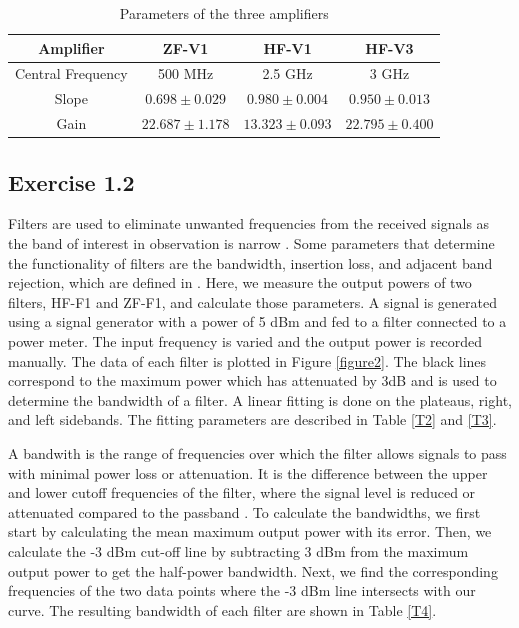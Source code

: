 \documentclass[12pt]{article}
\begin{document}
\begin{table}[H]
    \centering
    \caption{Parameters of the three amplifiers}
    \label{T1}
    \begin{tabular}{c |c |c |c}
        \hline
        \hline
        Amplifier & ZF-V1 & HF-V1 & HF-V3\\
        \hline
         Central Frequency & 500 MHz & 2.5 GHz & 3 GHz \\

        Slope & $0.698 \pm 0.029$ & $0.980 \pm 0.004$ & $0.950 \pm 0.013$ \\
     
        Gain & $22.687 \pm 1.178$ & $13.323 \pm 0.093$ & $22.795 \pm 0.400$ \\
        \hline
    \end{tabular}
\end{table}
\subsection{Exercise 1.2}
Filters are used to eliminate unwanted frequencies from the received signals as the band of interest in observation is narrow \cite{klein}. Some parameters that determine the functionality of filters are the bandwidth, insertion loss, and adjacent band rejection, which are defined in \cite{lecturenote}. Here, we measure the output powers of two filters, HF-F1 and ZF-F1, and calculate those parameters.  A signal is generated using a signal generator with a power of 5 dBm and fed to a filter connected to a power meter. The input frequency is varied and the output power is recorded manually. 
The data of each filter is plotted in Figure \ref{figure2}. The black lines correspond to the maximum power which has attenuated by 3dB and is used to determine the bandwidth of a filter. A linear fitting is done on the plateaus, right, and left sidebands. The fitting parameters are described in Table \ref{T2} and \ref{T3}. 

A bandwith is the range of frequencies over which the filter allows signals to pass with minimal power loss or attenuation. It is the difference between the upper and lower cutoff frequencies of the filter, where the signal level is reduced or attenuated compared to the passband \cite{bandwidth}. To calculate the bandwidths, we first start by calculating the mean maximum output power with its error. Then, we calculate the -3 dBm cut-off line by subtracting 3 dBm from the maximum output power to get the half-power bandwidth. Next, we find the corresponding frequencies of the two data points where the -3 dBm line intersects with our curve. The resulting bandwidth of each filter are shown in Table \ref{T4}. 
\end{document}
